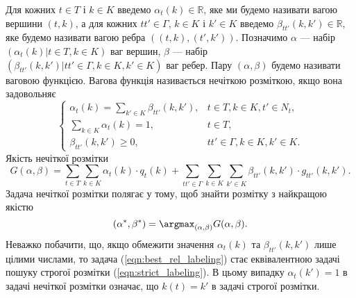 Для кожних $t\in T$ і $k\in K$ введемо $\alpha_t(k) \in \mathbb{R}$, яке ми будемо називати
вагою вершини $(t,k)$,
а для кожних $tt'\in\Gamma$, $k\in K$ і $k'\in K$ введемо $\beta_{tt'}(k,k') \in \mathbb{R}$,
яке будемо називати вагою ребра $((t,k),(t',k'))$. Позначимо $\alpha$ ---
набір $(\alpha_t(k)|t\in T, k\in K)$ ваг вершин,
$\beta$ --- набір $(\beta_{tt'}(k,k')|tt'\in\Gamma, k\in K, k'\in K)$ ваг ребер.
Пару $(\alpha, \beta)$ будемо називати ваговою функцією. Вагова функція називається
нечіткою розміткою, якщо вона задовольняє
\begin{equation*}
  \begin{cases}
    \alpha_t(k)=\sum\limits_{k' \in K} \beta_{tt'}(k,k')  , & t\in T, k\in K, t'\in N_t,\\
    \sum\limits_{k \in K} \alpha_t(k)=1, & t\in T,\\
    \beta_{tt'}(k,k')\geq 0, & tt'\in \Gamma, k\in K, k'\in K.
  \end{cases}
\end{equation*}
Якість нечіткої розмітки
\begin{equation*}
  G(\alpha, \beta)=\sum\limits_{t \in T}\sum\limits_{k\in K} \alpha_t(k)\cdot q_t(k) +
   \sum\limits_{tt'\in \Gamma}\sum\limits_{k\in K}\sum\limits_{k'\in K} \beta_{tt'}(k,k')\cdot g_{tt'}(k,k').
\end{equation*}
Задача нечіткої розмітки полягає у тому, щоб знайти розмітку з найкращою якістю
\begin{equation}
  (\alpha^*, \beta^*) = \argmax_{(\alpha, \beta)} G(\alpha, \beta).
  \label{eqn:best_rel_labeling}
\end{equation}
Неважко побачити, що, якщо обмежити значення $\alpha_t(k)$ та $\beta_{tt'}(k,k')$
лише цілими числами, то задача (\ref{eqn:best_rel_labeling}) стає еквівалентною
задачі пошуку строгої розмітки (\ref{eqn:strict_labeling}). В цьому випадку
$\alpha_t(k')=1$ в задачі нечіткої розмітки означає, що $k(t)=k'$ в задачі строгої розмітки.
